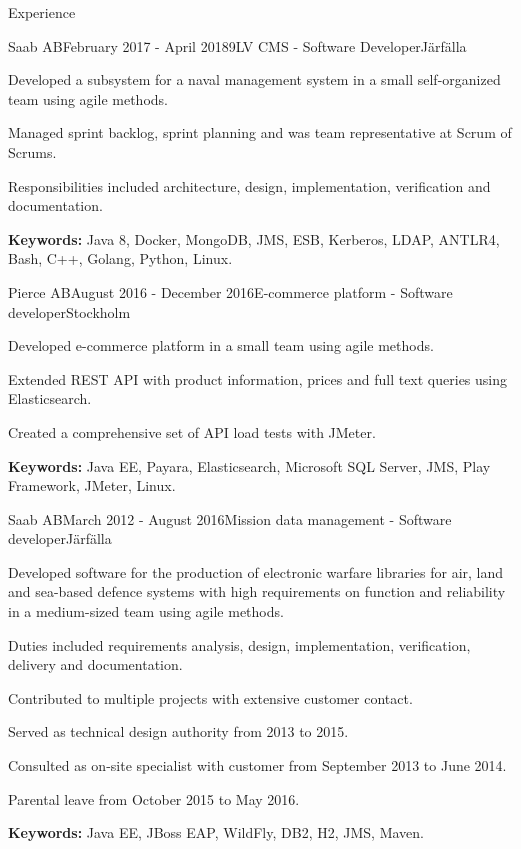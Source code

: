 \documentclass{resume}
\begin{document}
\begin{rSection}{Experience}
    \begin{rSubsection}{Saab AB}{February 2017 - April 2018}{9LV CMS - Software Developer}{Järfälla}
      \item Developed a subsystem for a naval management system in a small self-organized team using agile methods.
      \item Managed sprint backlog, sprint planning and was team representative at Scrum of Scrums.
      \item Responsibilities included architecture, design, implementation, verification and documentation.
      \item \textbf{Keywords:} Java 8, Docker, MongoDB, JMS, ESB, Kerberos, LDAP, ANTLR4, Bash, C++, Golang, Python, Linux.
    \end{rSubsection}

    \begin{rSubsection}{Pierce AB}{August 2016 - December 2016}{E-commerce platform - Software developer}{Stockholm}
      \item Developed e-commerce platform in a small team using agile methods.
      \item Extended REST API with product information, prices and full text queries using Elasticsearch.
      \item Created a comprehensive set of API load tests with JMeter.
      \item \textbf{Keywords:} Java EE, Payara, Elasticsearch, Microsoft SQL Server, JMS, Play Framework, JMeter, Linux.
    \end{rSubsection}

    \begin{rSubsection}{Saab AB}{March 2012 - August 2016}{Mission data management - Software developer}{Järfälla}
      \item Developed software for the production of electronic warfare libraries for air, land and sea-based defence systems with high requirements on function and reliability in a medium-sized team using agile methods.
      \item Duties included requirements analysis, design, implementation, verification, delivery and documentation.
      \item Contributed to multiple projects with extensive customer contact.
      \item Served as technical design authority from 2013 to 2015.
      \item Consulted as on-site specialist with customer from September 2013 to June 2014.
      \item Parental leave from October 2015 to May 2016.
      \item \textbf{Keywords:} Java EE, JBoss EAP, WildFly, DB2, H2, JMS, Maven.
    \end{rSubsection}


\end{rSection}
\end{document}
